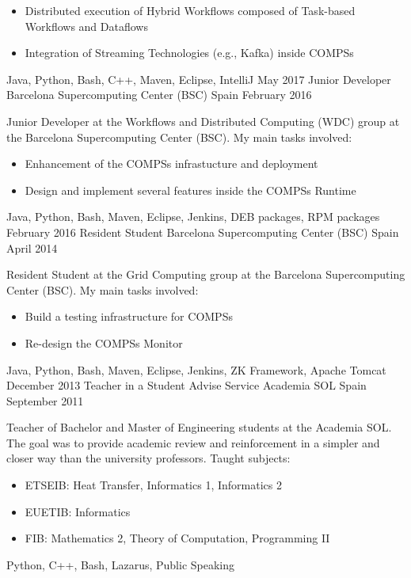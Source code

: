 \begin{experiences}
{\begin{itemize}
            \item Distributed execution of Hybrid Workflows composed of Task-based Workflows and Dataflows
            \item Integration of Streaming Technologies (e.g., Kafka) inside COMPSs
        \end{itemize}
        }
        {Java, Python, Bash, C++, Maven, Eclipse, IntelliJ}
    \emptySeparator
    \experience
        {May 2017}
        {Junior Developer}
        {Barcelona Supercomputing Center (BSC)}
        {Spain}
        {February 2016}
        {Junior Developer at the Workflows and Distributed Computing (WDC) group at the Barcelona Supercomputing Center (BSC). My main tasks involved:
        \begin{itemize}
            \item Enhancement of the COMPSs infrastucture and deployment
            \item Design and implement several features inside the COMPSs Runtime
        \end{itemize}
        }
        {Java, Python, Bash, Maven, Eclipse, Jenkins, DEB packages, RPM packages}
    \emptySeparator
    \experience
        {February 2016}
        {Resident Student}
        {Barcelona Supercomputing Center (BSC)}
        {Spain}
        {April 2014}
        {Resident Student at the Grid Computing group at the Barcelona Supercomputing Center (BSC). My main tasks involved:
        \begin{itemize}
            \item Build a testing infrastructure for COMPSs
            \item Re-design the COMPSs Monitor
        \end{itemize}
        }
        {Java, Python, Bash, Maven, Eclipse, Jenkins, ZK Framework, Apache Tomcat}
    \emptySeparator
    \experience
        {December 2013}
        {Teacher in a Student Advise Service}
        {Academia SOL}
        {Spain}
        {September 2011}
        {Teacher of Bachelor and Master of Engineering students at the Academia SOL. The goal was to provide academic review and reinforcement in a simpler and closer way than the university professors. Taught subjects:
        \begin{itemize}
            \item ETSEIB: Heat Transfer, Informatics 1, Informatics 2
            \item EUETIB: Informatics
            \item FIB: Mathematics 2, Theory of Computation, Programming II
        \end{itemize}
        }
        {Python, C++, Bash, Lazarus, Public Speaking}

\end{experiences}
